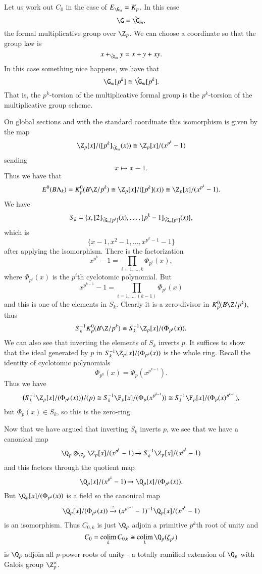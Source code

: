 \begin{example} \label{padicktheory}
Let us work out $C_0$ in the case of $E_{\G_m} = K_p$. In this case 
\[
\G = \hat{\G}_m,
\]
the formal multiplicative group over $\Z_p$. We can choose a coordinate so that the group law is
\[
x+_{\hat{\G}_m}y = x+y+xy.
\] 
In this case something nice happens, we have that
\[
\G_m[p^k] \cong \hat{\G}_m[p^k].
\]
That is, the $p^k$-torsion of the multiplicative formal group is the $p^k$-torsion of the multiplicative group scheme.

On global sections and with the standard coordinate this isomorphism is given by the map
\[
\Z_p[x]/([p^k]_{\hat{\G}_m}(x)) \cong \Z_p[x]/(x^{p^k}-1)
\]
sending
\[
x \mapsto x-1.
\]
Thus we have that 
\[
E^0(B\Lk) = K_{p}^0(B\Z/p^k) \cong \Z_p[x]/([p^k](x)) \cong \Z_p[x]/(x^{p^k}-1).
\]
We have
\[
S_k = \{x,[2]_{\hat{\G}_m[p^k]}(x),\ldots, [p^k-1]_{\hat{\G}_m[p^k]}(x)\},
\]
which is
\[
\{x-1,x^2-1, \ldots, x^{p^k-1}-1\}
\]
after applying the isomorphism.
There is the factorization
\[
x^{p^k}-1 = \prod_{i=1,\ldots,k}\Phi_{p^i}(x),
\]
where $\Phi_{p^i}(x)$ is the $p^i$th cyclotomic polynomial. But
\[
x^{p^{k-1}}-1 = \prod_{i=1,\ldots,(k-1)}\Phi_{p^i}(x)
\]
and this is one of the elements in $S_k$. Clearly it is a zero-divisor in $K_{p}^0(B\Z/p^k)$, thus
\[
S_{k}^{-1}K_{p}^0(B\Z/p^k) \cong S_{k}^{-1}\Z_p[x]/(\Phi_{p^k}(x)).
\]
We can also see that inverting the elements of $S_{k}$ inverts $p$. It suffices to show that the ideal generated by $p$ in $S_{k}^{-1}\Z_p[x]/(\Phi_{p^k}(x))$ is the whole ring. Recall the identity of cyclotomic polynomials 
\[
\Phi_{p^k}(x) = \Phi_p(x^{p^{k-1}}).
\]
Thus we have
\[
\big ( S_{k}^{-1}\Z_p[x]/(\Phi_{p^k}(x)) \big )/(p) \cong S_{k}^{-1}\F_p[x]/(\Phi_{p}(x^{p^{k-1}})) \cong S_{k}^{-1}\F_p[x]/(\Phi_{p}(x)^{p^{k-1}}),
\]
but $\Phi_{p}(x) \in S_k$, so this is the zero-ring.

Now that we have argued that inverting $S_k$ inverts $p$, we see that we have a canonical map
\[
\Q_p \otimes_{\Z_p} \Z_p[x]/(x^{p^k}-1) \xrightarrow{} S_{k}^{-1}\Z_p[x]/(x^{p^k}-1) 
\]
and this factors through the quotient map
\[
\Q_p[x]/(x^{p^k}-1) \xrightarrow{} \Q_p[x]/(\Phi_{p^k}(x)).
\]
But $\Q_p[x]/(\Phi_{p^k}(x))$ is a field so the canonical map
\[
\Q_p[x]/(\Phi_{p^k}(x)) \xrightarrow{\cong} (x^{p^{k-1}}-1)^{-1}\Q_p[x]/(x^{p^k}-1)
\]
is an isomorphism. Thus $C_{0,k}$ is just $\Q_p$ adjoin a primitive $p^k$th root of unity and
\[
C_0 = \colim_k C_{0,k} \cong \colim_k \Q_p(\zeta_{p^k})
\]
is $\Q_p$ adjoin all $p$-power roots of unity - a totally ramified extension of $\Q_p$ with Galois group $\Z_{p}^{\times}$.
\end{example}

